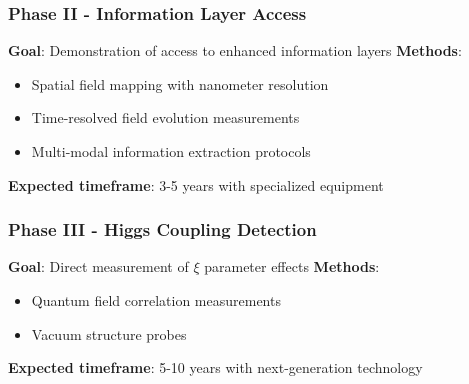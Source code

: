 	\subsubsection{Phase II - Information Layer Access}
	
	\textbf{Goal}: Demonstration of access to enhanced information layers
	\textbf{Methods}:
	\begin{itemize}
		\item Spatial field mapping with nanometer resolution
		\item Time-resolved field evolution measurements
		\item Multi-modal information extraction protocols
	\end{itemize}
	\textbf{Expected timeframe}: 3-5 years with specialized equipment
	
	\subsubsection{Phase III - Higgs Coupling Detection}
	
	\textbf{Goal}: Direct measurement of $\xi$ parameter effects
	\textbf{Methods}:
	\begin{itemize}
		\item Quantum field correlation measurements
		\item Vacuum structure probes
	\end{itemize}
	\textbf{Expected timeframe}: 5-10 years with next-generation technology
	